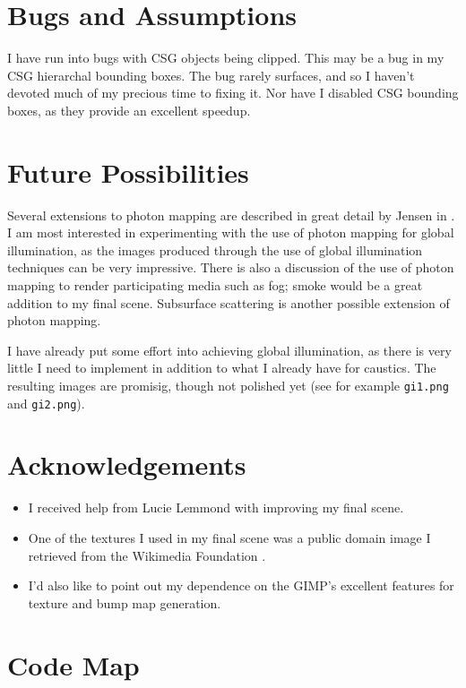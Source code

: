 \documentclass{article}
\begin{document}
\section{Bugs and Assumptions}

I have run into bugs with CSG objects being clipped. This may be a bug in my CSG hierarchal bounding boxes. The bug rarely surfaces, and so I haven't devoted much of my precious time to fixing it. Nor have I disabled CSG bounding boxes, as they provide an excellent speedup.

\section{Future Possibilities}

Several extensions to photon mapping are described in great detail by Jensen in
\cite{coursenotes}. I am most interested in experimenting with the use of photon
mapping for global illumination, as the images produced through the use of
global illumination techniques can be very impressive. There is also a discussion
of the use of photon mapping to render participating media such as fog; smoke would
be a great addition to my final scene. Subsurface scattering is another possible
extension of photon mapping.

I have already put some effort into achieving global illumination, as there is very little I need to implement in addition to what I already have for caustics. The resulting images are promisig, though not polished yet (see for example {\tt gi1.png} and {\tt gi2.png}).

\section{Acknowledgements}

\begin{itemize}
  \item I received help from Lucie Lemmond with improving my final scene.

  \item One of the textures I used in my final scene was a public domain image I retrieved from the Wikimedia Foundation \cite{wikimedia}.

  \item I'd also like to point out my dependence on the GIMP's excellent features for texture and bump map generation.
\end{itemize}

\section{Code Map}
\end{document}
